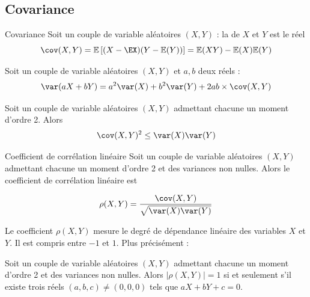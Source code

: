 		\subsection{Covariance}
		
		\begin{definition}{Covariance}
			Soit un couple de variable aléatoires $(X,Y)$ : la  de $X$ et $Y$ est le réel 
			$$\cov(X,Y) = \mathbb{E} \left[ (X-\EX)(Y-\mathbb{E}(Y)) \right] = \mathbb{E}(XY)-\mathbb{E}(X)\mathbb{E}(Y)$$
		\end{definition}
		
		
%		
		
		\begin{proposition}{}{}
			Soit un couple de variable aléatoires $(X,Y)$ et $a,b$ deux réels :
			$$\var(aX+bY)=a^2\var(X)+b^2\var(Y)+2ab \times \cov(X,Y)$$
		\end{proposition}
		
		
		
		\begin{proposition}{}{}
			Soit un couple de variable aléatoires $(X,Y)$ admettant chacune un moment d'ordre 2. Alors 
			$$\cov(X,Y)^2 \leq \var(X)\var(Y)$$	
			
		\end{proposition}
		
		\begin{definition}{Coefficient de corrélation linéaire}{}
			Soit un couple de variable aléatoires $(X,Y)$ admettant chacune un moment d'ordre 2 et des variances non nulles. Alors le coefficient de corrélation linéaire est 
			
			$$\rho(X,Y)=\frac{\cov(X,Y)}{\sqrt{\var(X)\var(Y)}}$$
		\end{definition}
		
		Le coefficient $\rho(X,Y)$ mesure le degré de dépendance linéaire des variables $X$ et $Y$. Il est compris entre $-1$ et $1$. Plus précisément :
		
		\begin{proposition}{}{}
			Soit un couple de variable aléatoires $(X,Y)$ admettant chacune un moment d'ordre 2 et des variances non nulles. Alors $|\rho(X,Y)|=1$ si et seulement s'il existe trois réels $(a,b,c) \neq (0,0,0)$ tels que $aX+bY+c = 0$.
		\end{proposition}
		
